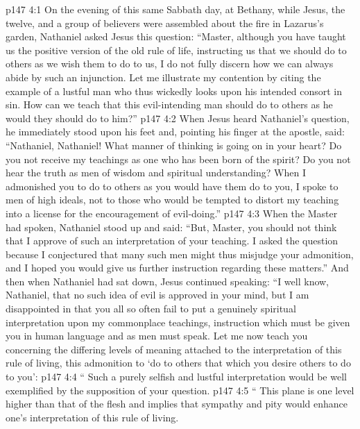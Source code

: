 \vs p147 4:1 On the evening of this same Sabbath day, at Bethany, while Jesus, the twelve, and a group of believers were assembled about the fire in Lazarus’s garden, Nathaniel asked Jesus this question: “Master, although you have taught us the positive version of the old rule of life, instructing us that we should do to others as we wish them to do to us, I do not fully discern how we can always abide by such an injunction. Let me illustrate my contention by citing the example of a lustful man who thus wickedly looks upon his intended consort in sin. How can we teach that this evil\hyp{}intending man should do to others as he would they should do to him?”
\vs p147 4:2 When Jesus heard Nathaniel’s question, he immediately stood upon his feet and, pointing his finger at the apostle, said: “Nathaniel, Nathaniel! What manner of thinking is going on in your heart? Do you not receive my teachings as one who has been born of the spirit? Do you not hear the truth as men of wisdom and spiritual understanding? When I admonished you to do to others as you would have them do to you, I spoke to men of high ideals, not to those who would be tempted to distort my teaching into a license for the encouragement of evil\hyp{}doing.”
\vs p147 4:3 When the Master had spoken, Nathaniel stood up and said: “But, Master, you should not think that I approve of such an interpretation of your teaching. I asked the question because I conjectured that many such men might thus misjudge your admonition, and I hoped you would give us further instruction regarding these matters.” And then when Nathaniel had sat down, Jesus continued speaking: \textcolor{ubdarkred}{“I well know, Nathaniel, that no such idea of evil is approved in your mind, but I am disappointed in that you all so often fail to put a genuinely spiritual interpretation upon my commonplace teachings, instruction which must be given you in human language and as men must speak. Let me now teach you concerning the differing levels of meaning attached to the interpretation of this rule of living, this admonition to ‘do to others that which you desire others to do to you’:}\plusone
\pc \vs p147 4:4 \textcolor{ubdarkred}{“\bibnobreakspace {} Such a purely selfish and lustful interpretation would be well exemplified by the supposition of your question.}
\pc \vs p147 4:5 \textcolor{ubdarkred}{“\bibnobreakspace {} This plane is one level higher than that of the flesh and implies that sympathy and pity would enhance one’s interpretation of this rule of living.}

